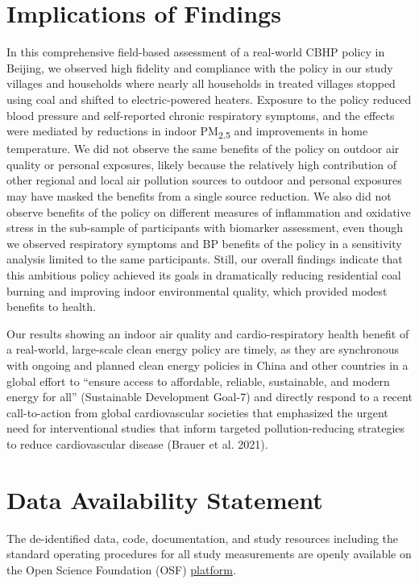 \documentclass[
  letterpaper,
  DIV=11,
  numbers=noendperiod]{scrartcl}
\begin{document}
\section{Implications of Findings}\label{implications-of-findings}

In this comprehensive field-based assessment of a real-world CBHP policy
in Beijing, we observed high fidelity and compliance with the policy in
our study villages and households where nearly all households in treated
villages stopped using coal and shifted to electric-powered heaters.
Exposure to the policy reduced blood pressure and self-reported chronic
respiratory symptoms, and the effects were mediated by reductions in
indoor PM\textsubscript{2.5} and improvements in home temperature. We
did not observe the same benefits of the policy on outdoor air quality
or personal exposures, likely because the relatively high contribution
of other regional and local air pollution sources to outdoor and
personal exposures may have masked the benefits from a single source
reduction. We also did not observe benefits of the policy on different
measures of inflammation and oxidative stress in the sub-sample of
participants with biomarker assessment, even though we observed
respiratory symptoms and BP benefits of the policy in a sensitivity
analysis limited to the same participants.  Still, our
overall findings indicate that this ambitious policy achieved its goals
in dramatically reducing residential coal burning and improving indoor
environmental quality, which provided modest benefits to health.

Our results showing an indoor air quality and cardio-respiratory health
benefit of a real-world, large-scale clean energy policy are timely, as
they are synchronous with ongoing and planned clean energy policies in
China and other countries in a global effort to ``ensure access to
affordable, reliable, sustainable, and modern energy for all''
(Sustainable Development Goal-7) and directly respond to a recent
call-to-action from global cardiovascular societies that emphasized the
urgent need for interventional studies that inform targeted
pollution-reducing strategies to reduce cardiovascular disease (Brauer
et al. 2021).

\section{Data Availability Statement}\label{data-availability-statement}

The de-identified data, code, documentation, and study resources
including the standard operating procedures for all study measurements
are openly available on the Open Science Foundation (OSF)
\href{https://osf.io/8twds/?view_only=c41dd3d6228240d6aad92f81371c5339}{platform}.
\end{document}
